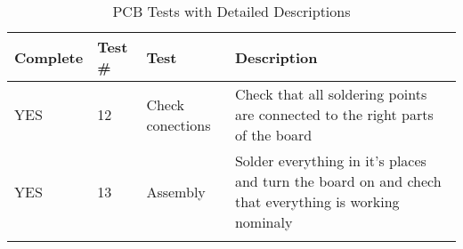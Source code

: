 \begin{longtable}{|m{}|m{}|m{}|m{}|}
\hline
Complete & Test \# & Test & Description \\ \hline
YES & 12 & Check conections & Check that all soldering points are connected to the right parts of the board \\ \hline
YES & 13 & Assembly & Solder everything in it's places and turn the board on and chech that everything is working nominaly
\\ \hline
\caption{PCB Tests with Detailed Descriptions}
\label{tab:test33-result-PCB-Tests}
\end{longtable}